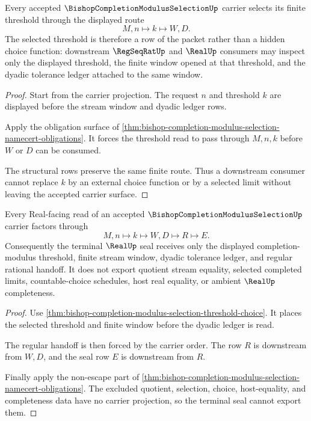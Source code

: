 \begin{theorem}
\label{thm:bishop-completion-modulus-selection-threshold-choice}
Every accepted $\BishopCompletionModulusSelectionUp$ carrier selects its finite threshold through the displayed route
$$
M,n\longmapsto k\longmapsto W,D .
$$
The selected threshold is therefore a row of the packet rather than a hidden choice function: downstream $\RegSeqRatUp$ and $\RealUp$ consumers may inspect only the displayed threshold, the finite window opened at that threshold, and the dyadic tolerance ledger attached to the same window.
\end{theorem}
\begin{proof}
Start from the carrier projection. The request $n$ and threshold $k$ are displayed before the stream window and dyadic ledger rows.

Apply the obligation surface of \autoref{thm:bishop-completion-modulus-selection-namecert-obligations}. It forces the threshold read to pass through $M,n,k$ before $W$ or $D$ can be consumed.

The structural rows preserve the same finite route. Thus a downstream consumer cannot replace $k$ by an external choice function or by a selected limit without leaving the accepted carrier surface.
\end{proof}

\begin{theorem}
\label{thm:bishop-completion-modulus-selection-real-seal-nonescape}
Every Real-facing read of an accepted $\BishopCompletionModulusSelectionUp$ carrier factors through
$$
M,n \longmapsto k \longmapsto W,D \longmapsto R \longmapsto E .
$$
Consequently the terminal $\RealUp$ seal receives only the displayed completion-modulus threshold, finite stream window, dyadic tolerance ledger, and regular rational handoff. It does not export quotient stream equality, selected completed limits, countable-choice schedules, host real equality, or ambient $\RealUp$ completeness.
\end{theorem}
\begin{proof}
Use \autoref{thm:bishop-completion-modulus-selection-threshold-choice}. It places the selected threshold and finite window before the dyadic ledger is read.

The regular handoff is then forced by the carrier order. The row $R$ is downstream from $W,D$, and the seal row $E$ is downstream from $R$.

Finally apply the non-escape part of \autoref{thm:bishop-completion-modulus-selection-namecert-obligations}. The excluded quotient, selection, choice, host-equality, and completeness data have no carrier projection, so the terminal seal cannot export them.
\end{proof}

